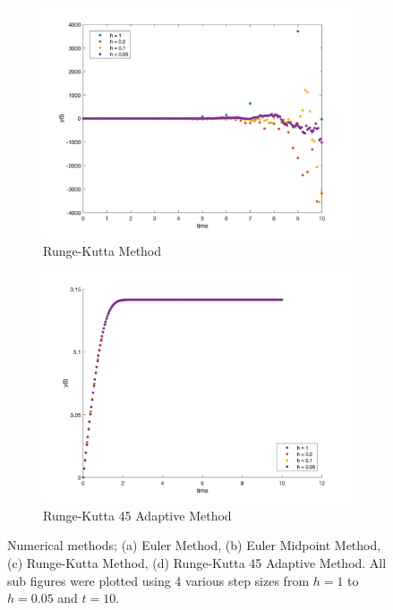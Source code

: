 \documentclass[12pt]{article}
\begin{document}
\begin{figure}[htp]
\begin{subfigure}{0.49\columnwidth}
\centering
\includegraphics[width=\textwidth]{rk_t_10.png}
\caption{Runge-Kutta Method}
\label{fig:time3}
\end{subfigure}\hfill
\begin{subfigure}{0.49\columnwidth}
\centering
\includegraphics[width=\textwidth]{rk_adapt_t_10.png}
\caption{Runge-Kutta 45 Adaptive Method}
\label{fig:time4}
\end{subfigure}

\caption{Numerical methods; (a) Euler Method, (b) Euler Midpoint Method, (c) Runge-Kutta Method, (d) Runge-Kutta 45 Adaptive Method. All sub figures were plotted using 4 various step sizes from $h = 1$ to $h = 0.05$ and $t = 10$.}
\label{fig:time}

\end{figure}
\end{document}

